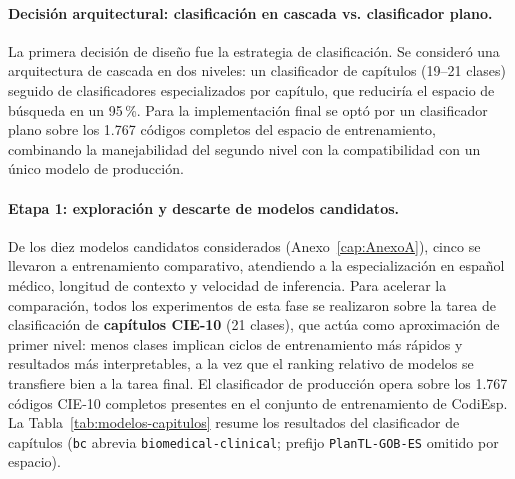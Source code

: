 \paragraph{Decisión arquitectural: clasificación en cascada vs. clasificador plano.}
La primera decisión de diseño fue la estrategia de clasificación. Se consideró una arquitectura de cascada en dos niveles: un clasificador de capítulos (19–21 clases) seguido de clasificadores especializados por capítulo, que reduciría el espacio de búsqueda en un 95\,\%. Para la implementación final se optó por un clasificador plano sobre los 1.767 códigos completos del espacio de entrenamiento, combinando la manejabilidad del segundo nivel con la compatibilidad con un único modelo de producción.

\paragraph{Etapa 1: exploración y descarte de modelos candidatos.}
De los diez modelos candidatos considerados (Anexo~\ref{cap:AnexoA}), cinco se llevaron a entrenamiento comparativo, atendiendo a la especialización en español médico, longitud de contexto y velocidad de inferencia. Para acelerar la comparación, todos los experimentos de esta fase se realizaron sobre la tarea de clasificación de \textbf{capítulos CIE-10} (21 clases), que actúa como aproximación de primer nivel: menos clases implican ciclos de entrenamiento más rápidos y resultados más interpretables, a la vez que el ranking relativo de modelos se transfiere bien a la tarea final. El clasificador de producción opera sobre los 1.767 códigos CIE-10 completos presentes en el conjunto de entrenamiento de CodiEsp. La Tabla~\ref{tab:modelos-capitulos} resume los resultados del clasificador de capítulos (\texttt{bc} abrevia \texttt{biomedical-clinical}; prefijo \texttt{PlanTL-GOB-ES} omitido por espacio).


